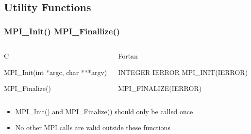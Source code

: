 \documentclass{beamer}
\begin{document}
  \subsection{Utility Functions}
  \begin{frame}[fragile]
  \frametitle{MPI\_Init() MPI\_Finallize()}
   \begin{columns}[T]
    \begin{column}{5cm}
     \begin{block}{C}
      \begin{semiverbatim}
MPI\_Init(int  *argc,
          char ***argv)

MPI\_Finalize()
      \end{semiverbatim}
     \end{block}
    \end{column}
    \begin{column}{5cm}
     \begin{block}{Fortan}
      \begin{semiverbatim}
INTEGER IERROR
MPI\_INIT(IERROR)

MPI\_FINALIZE(IERROR)
      \end{semiverbatim}
     \end{block}
    \end{column}
   \end{columns}
   \begin{itemize}
     \item<2-> MPI\_Init() and MPI\_Finalize() should only be called once
     \item<3-> No other MPI calls are valid outside these functions
   \end{itemize}
\end{frame}
\end{document}
